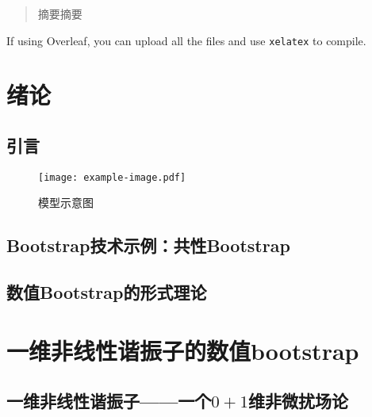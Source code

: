 \documentclass[oneside]{fduthesis}
\begin{document}
\frontmatter

\tableofcontents

\begin{abstract}
摘要摘要
\end{abstract}

\begin{abstract*}
If using Overleaf, you can upload all the files and use \verb|xelatex| to compile.
\end{abstract*}

\mainmatter


%   
%   
%   

\chapter{绪论}

\section{引言}

\begin{figure}[h]
  \centering
  \texttt{[image: example-image.pdf]}
  \caption{模型示意图}
  \label{fig:example}
\end{figure}

\section{Bootstrap技术示例：共性Bootstrap}

\section{数值Bootstrap的形式理论}

\chapter{一维非线性谐振子的数值bootstrap}

\section{一维非线性谐振子——一个$0+1$维非微扰场论}
\end{document}
